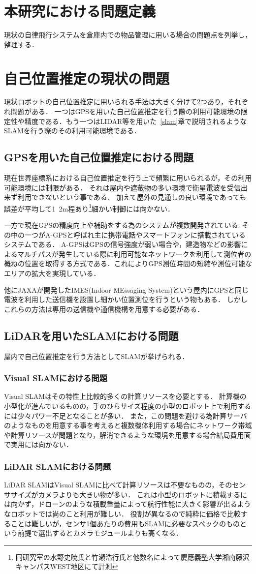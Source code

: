 \section{本研究における問題定義}
現状の自律飛行システムを倉庫内での物品管理に用いる場合の問題点を列挙し，整理する．

\section{自己位置推定の現状の問題}
現状ロボットの自己位置推定に用いられる手法は大きく分けて2つあり，それぞれ問題がある．
一つはGPSを用いた自己位置推定を行う際の利用可能環境の限定性や精度である．もう一つはLIDAR等を用いた~\ref{slam}章で説明されるようなSLAMを行う際のその利用可能環境である．

\subsection{GPSを用いた自己位置推定における問題}
現在世界座標系における自己位置推定を行う上で頻繁に用いられるが，その利用可能環境には制限がある．
それは屋内や遮蔽物の多い環境で衛星電波を受信出来ず利用できないという事である．
加えて屋外の見通しの良い環境であっても誤差が平均して1~2m程あり\footnote{同研究室の水野史暁氏と竹瀬浩行氏と他数名によって慶應義塾大学湘南藤沢キャンパスWEST地区にて計測}細かい制御には向かない．

一方で現在GPSの精度向上や補助をする為のシステムが複数開発されている.
その中の一つがA-GPS\cite{agps}と呼ばれ主に携帯電話やスマートフォンに搭載されているシステムである．
A-GPSはGPSの信号強度が弱い場合や，建造物などの影響によるマルチパスが発生している際に利用可能なネットワークを利用して測位者の概ねの位置を取得する方式である．これによりGPS測位時間の短縮や測位可能なエリアの拡大を実現している．

他にJAXAが開発したIMES(Indoor MEssaging System)\cite{imes}という屋内にGPSと同じ電波を利用した送信機を設置し細かい位置測位を行うという物もある．
しかしこれらの方法は専用の送信機や通信機構を用意する必要がある．


\subsection{LiDARを用いたSLAMにおける問題}
屋内で自己位置推定を行う方法としてSLAMが挙げられる．

\subsubsection{Visual SLAMにおける問題}
Visual SLAMはその特性上比較的多くの計算リソースを必要とする．
計算機の小型化が進んでいるものの，手のひらサイズ程度の小型のロボット上で利用するには少々パワー不足となることが多い．
また，この問題を避ける為計算サーバのようなものを用意する事を考えると複数機体利用する場合にネットワーク帯域や計算リソースが問題となり，解消できるような環境を用意する場合結局費用面で実用には向かない．

\subsubsection{LiDAR SLAMにおける問題}
LiDAR SLAMはVisual SLAMに比べて計算リソースは不要なものの，そのセンササイズがカメラよりも大きい物が多い．
これは小型のロボットに積載するには向かず，ドローンのような積載重量によって航行性能に大きく影響が出るようなロボットでは尚のこと利用が難しい．
役割が異なるので純粋に価格で比較することは難しいが，センサ1個あたりの費用もSLAMに必要なスペックのものという前提で選出するとカメラモジュールよりも高くなる．
